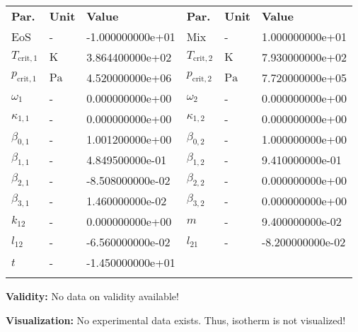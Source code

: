 \begin{longtable}[l]{lll|lll}
\toprule
\addlinespace
\textbf{Par.} & \textbf{Unit} & \textbf{Value} &	\textbf{Par.} & \textbf{Unit} & \textbf{Value} \\
\addlinespace
\midrule
\endhead

\bottomrule
\endfoot
\bottomrule
\endlastfoot
\addlinespace

EoS & - & -1.000000000e+01 & Mix & - & 1.000000000e+01 \\
$T_\mathrm{crit,1}$ & $\si{\kelvin}$ & 3.864400000e+02 & $T_\mathrm{crit,2}$ & $\si{\kelvin}$ & 7.930000000e+02 \\
$p_\mathrm{crit,1}$ & $\si{\pascal}$ & 4.520000000e+06 & $p_\mathrm{crit,2}$ & $\si{\pascal}$ & 7.720000000e+05 \\
$\omega_{1}$ & - & 0.000000000e+00 & $\omega_{2}$ & - & 0.000000000e+00 \\
$\kappa_{1,1}$ & - & 0.000000000e+00 & $\kappa_{1,2}$ & - & 0.000000000e+00 \\
$\beta_{0,1}$ & - & 1.001200000e+00 & $\beta_{0,2}$ & - & 1.000000000e+00 \\
$\beta_{1,1}$ & - & 4.849500000e-01 & $\beta_{1,2}$ & - & 9.410000000e-01 \\
$\beta_{2,1}$ & - & -8.508000000e-02 & $\beta_{2,2}$ & - & 0.000000000e+00 \\
$\beta_{3,1}$ & - & 1.460000000e-02 & $\beta_{3,2}$ & - & 0.000000000e+00 \\
$k_{12}$ & - & 0.000000000e+00 & $m$ & - & 9.400000000e-02 \\
$l_{12}$ & - & -6.560000000e-02 & $l_{21}$ & - & -8.200000000e-02 \\
$t$ & - & -1.450000000e+01 & & & \\

\addlinespace\end{longtable}

\textbf{Validity:}
\newline
No data on validity available!
\newline

\textbf{Visualization:}
%
\newline
No experimental data exists. Thus, isotherm is not visualized!
%

\FloatBarrier
\newpage
